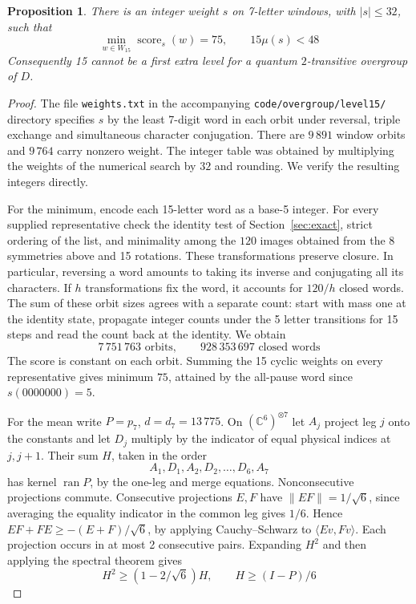 \documentclass[11pt,a4paper]{amsart}
\newtheorem{proposition}[theorem]{Proposition}
\newcommand{\score}{\operatorname{score}}
\begin{document}
\begin{proposition}\label{prop:lebanner}
There is an integer weight $s$ on 7-letter windows, with $|s|\leq32$, such that
\[
 \min_{w\in W_{15}}\score_s(w)=75,\qquad 15\mu(s)<48
\]
Consequently 15 cannot be a first extra level for a quantum $2$-transitive overgroup of $D$.
\end{proposition}
\begin{proof}
The file \texttt{weights.txt} in the accompanying \texttt{code/overgroup/level15/} directory specifies $s$ by the least 7-digit word in each orbit under reversal, triple exchange and simultaneous character conjugation. There are $9\,891$ window orbits and $9\,764$ carry nonzero weight. The integer table was obtained by multiplying the weights of the numerical search by $32$ and rounding. We verify the resulting integers directly.

For the minimum, encode each 15-letter word as a base-5 integer. For every supplied representative check the identity test of Section~\ref{sec:exact}, strict ordering of the list, and minimality among the $120$ images obtained from the 8 symmetries above and 15 rotations. These transformations preserve closure. In particular, reversing a word amounts to taking its inverse and conjugating all its characters. If $h$ transformations fix the word, it accounts for $120/h$ closed words. The sum of these orbit sizes agrees with a separate count: start with mass one at the identity state, propagate integer counts under the 5 letter transitions for 15 steps and read the count back at the identity. We obtain
\[
 7\,751\,763\text{ orbits},\qquad 928\,353\,697\text{ closed words}
\]
The score is constant on each orbit. Summing the 15 cyclic weights on every representative gives minimum $75$, attained by the all-pause word since $s(0000000)=5$.

For the mean write $P=p_7$, $d=d_7=13\,775$. On $(\mathbb C^6)^{\otimes7}$ let $A_j$ project leg $j$ onto the constants and let $D_j$ multiply by the indicator of equal physical indices at $j,j+1$. Their sum $H$, taken in the order
\[
 A_1,D_1,A_2,D_2,\ldots,D_6,A_7
\]
has kernel $\operatorname{ran}P$, by the one-leg and merge equations. Nonconsecutive projections commute. Consecutive projections $E,F$ have $\|EF\|=1/\sqrt6$, since averaging the equality indicator in the common leg gives $1/6$. Hence $EF+FE\geq-(E+F)/\sqrt6$, by applying Cauchy--Schwarz to $\langle Ev,Fv\rangle$. Each projection occurs in at most 2 consecutive pairs. Expanding $H^2$ and then applying the spectral theorem gives
\[
 H^2\geq(1-2/\sqrt6)H,\qquad H\geq (I-P)/6
\]


\end{proof}
\end{document}
